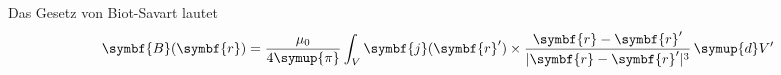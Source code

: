 Das Gesetz von Biot-Savart lautet
\begin{equation}
  \symbf{B}(\symbf{r}) = \frac{\mu_0}{4 \symup{\pi}}
    \int_V \symbf{j}(\symbf{r}') \times
      \frac{\symbf{r} - \symbf{r}'}{\lvert \symbf{r} - \symbf{r}' \rvert^3}
        \, \symup{d}V'
\end{equation}
